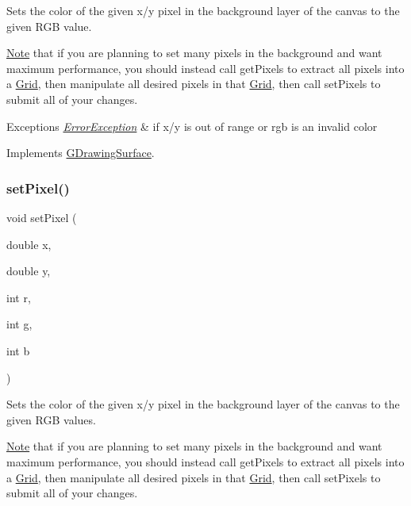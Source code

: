 Sets the color of the given x/y pixel in the background layer of the canvas to the given R\+GB value. 

\mbox{\hyperlink{classNote}{Note}} that if you are planning to set many pixels in the background and want maximum performance, you should instead call get\+Pixels to extract all pixels into a \mbox{\hyperlink{classGrid}{Grid}}, then manipulate all desired pixels in that \mbox{\hyperlink{classGrid}{Grid}}, then call set\+Pixels to submit all of your changes.


\begin{DoxyExceptions}{Exceptions}
{\em \mbox{\hyperlink{classErrorException}{Error\+Exception}}} & if x/y is out of range or rgb is an invalid color \\
\hline
\end{DoxyExceptions}


Implements \mbox{\hyperlink{classGDrawingSurface_ac9f0a75ccb0abe1123046bab56479b84}{G\+Drawing\+Surface}}.

\mbox{\label{classGCanvas_af9aca140f86a6de6a4368d41349dd57c}} 
\subsubsection{\texorpdfstring{set\+Pixel()}{setPixel()}\hspace{0.1cm}{\footnotesize\ttfamily [3/3]}}
{\footnotesize\ttfamily void set\+Pixel (\begin{DoxyParamCaption}\item[{double}]{x,  }\item[{double}]{y,  }\item[{int}]{r,  }\item[{int}]{g,  }\item[{int}]{b }\end{DoxyParamCaption})\hspace{0.3cm}{\ttfamily [virtual]}}



Sets the color of the given x/y pixel in the background layer of the canvas to the given R\+GB values. 

\mbox{\hyperlink{classNote}{Note}} that if you are planning to set many pixels in the background and want maximum performance, you should instead call get\+Pixels to extract all pixels into a \mbox{\hyperlink{classGrid}{Grid}}, then manipulate all desired pixels in that \mbox{\hyperlink{classGrid}{Grid}}, then call set\+Pixels to submit all of your changes.


